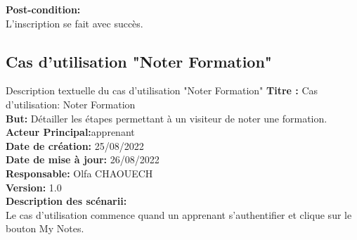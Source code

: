\textbf{Post-condition:}\\
L'inscription se fait avec succès.





\subsection{Cas d'utilisation "Noter Formation"}
Description textuelle du cas d'utilisation "Noter Formation"
\textbf{Titre :} Cas d'utilisation: Noter Formation\\
\textbf{But:} Détailler les étapes permettant à un visiteur de noter une formation.\\
\textbf{Acteur Principal:}apprenant\\
\textbf{Date de création:} 25/08/2022\\
\textbf{Date de mise à jour:} 26/08/2022\\
\textbf{Responsable:} Olfa CHAOUECH\\
\textbf{Version:} 1.0\\
\textbf{Description des scénarii:}\\
Le cas d'utilisation commence quand un apprenant s'authentifier et clique sur le bouton My Notes.

